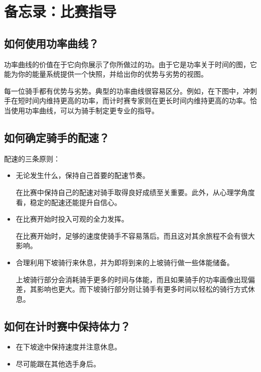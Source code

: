 \documentclass[11pt,a4paper]{ctexart}
\begin{document}
\section{备忘录：比赛指导}

\subsection*{如何使用功率曲线？}

功率曲线的价值在于它向你展示了你所做过的功。由于它是功率关于时间的图，它能为你的能量系统提供一个快照，并给出你的优势与劣势的视图。

每一位骑手都有优势与劣势。典型的功率曲线很容易区分。例如，在下图中，冲刺手在短时间内维持更高的功率，而计时赛专家则在更长时间内维持更高的功率。恰当使用功率曲线，可以为骑手制定更专业的指导。

\subsection*{如何确定骑手的配速？}

配速的三条原则：

\begin{itemize}
\item 无论发生什么，保持自己首要的配速节奏。

在比赛中保持自己的配速对骑手取得良好成绩至关重要。此外，从心理学角度看，稳定的配速还能提升自信心。

\item 在比赛开始时投入可观的全力发挥。

在比赛开始时，足够的速度使骑手不容易落后。而且这对其余旅程不会有很大影响。

\item 合理利用下坡骑行来休息，并为即将到来的上坡骑行做一些体能储备。

上坡骑行部分会消耗骑手更多的时间与体能，而且如果骑手的功率画像出现偏差，其影响也更大。而下坡骑行部分则让骑手有更多时间以轻松的骑行方式休息。
\end{itemize}

\subsection*{如何在计时赛中保持体力？}

\begin{itemize}
\item 在下坡途中保持速度并注意休息。
\item 尽可能跟在其他选手身后。
\end{itemize}
\end{document}
